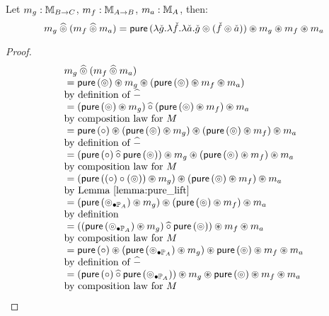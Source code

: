 \documentclass{article}
\newenvironment{lemma}[1]{%
  \renewcommand\thelemmainner{#1}%
  \lemmainner
}{\endlemmainner}
\begin{document}
\begin{lemma}{15}\label{lemma:pappl_comp_appl}
Let $m_g:\mstream{B\rightarrow C}$, $m_f:\mstream{A\rightarrow B}$, $m_a:\mstream{A}$, then:
$$
m_g \alift{\pappl} (m_f \alift{\pappl} m_a)
 = \apure\, (\lambda \pstr{g}. \lambda \pstr{f}. \lambda \pstr{a}. \pstr{g} \pappl (\pstr{f}\pappl \pstr{a})) \appl m_g \appl m_f \appl m_a
$$
\end{lemma}
\begin{proof}
$$
\begin{array}{ll}
m_g \alift{\pappl} (m_f \alift{\pappl} m_a) \\
{}= \apure\, (\pappl) \appl m_g \appl (\apure\, (\pappl) \appl m_f \appl m_a) \\
 \mbox{by definition of }\alift{-}\\
{}= (\apure\, (\pappl) \appl m_g) \alift{\comp} (\apure\, (\pappl) \appl m_f)  \appl m_a \\
 \mbox{by composition law for }M \\
{}=   \apure\, (\comp) \appl  (\apure\, (\pappl) \appl m_g) \appl (\apure\, (\pappl) \appl m_f) \appl m_a \\
 \mbox{by definition of }\alift{-}\\
{}=   (\apure\, (\comp) \alift{\comp}  \apure\, (\pappl)) \appl m_g \appl (\apure\, (\pappl) \appl m_f) \appl m_a \\
 \mbox{by composition law for }M \\
{}=   ( \apure\, ((\comp) \comp (\pappl)) \appl m_g ) \appl (\apure\, (\pappl) \appl m_f)   \appl m_a\\
 \mbox{by Lemma \ref{lemma:pure_lift}}\\
{}=   ( \apure\, (\clift{\pappl}{\pstream{A}}) \appl m_g ) \appl (\apure\, (\pappl) \appl m_f)   \appl m_a\\
 \mbox{by definition}\\
{}=   ( ( \apure\, (\clift{\pappl}{\pstream{A}})  \appl m_g ) \alift{\comp} \apure\, (\pappl)) \appl m_f  \appl m_a\\
 \mbox{by composition law for }M \\
{}=  \apure\, (\comp) \appl (\apure\, (\clift{\pappl}{\pstream{A}})  \appl m_g ) \appl \apure\, (\pappl)  \appl m_f  \appl m_a\\
 \mbox{by definition of }\alift{-} \\
{}=   (\apure\, (\comp) \alift{\comp}  \apure\, (\clift{\pappl}{\pstream{A}}) ) \appl m_g \appl \apure\, (\pappl) \appl m_f \appl m_a\\
 \mbox{by composition law for }M \\

\end{array}$$
\end{proof}
\end{document}
